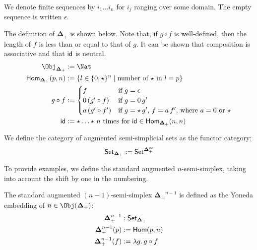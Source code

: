 \documentclass{msc}
\newcommand{\DeltaPlus}{\ensuremath{\boldsymbol{\Delta}_+}}
\newcommand{\kstar}{{\star}}
\begin{document}
\begin{notation}
  We denote finite sequences by $i_1 \ldots i_n$ for $i_j$ ranging over some domain. The empty sequence is written $\epsilon$.
\end{notation}

\begin{definition}[$\DeltaPlus$]
  The definition of $\DeltaPlus$ is shown below. Note that, if $g \circ f$ is well-defined, then the length of $f$ is less than or equal to that of $g$. It can be shown that composition is associative and that $\mathsf{id}$ is neutral.
  \begin{align*}
    \Obj_{\DeltaPlus}       & := \Nat                                                                         \\
    \Hom_{\DeltaPlus}(p, n) & := \{l \in \{0, \kstar\}^n \mid \text{number of $\kstar$ in $l = p$}\}          \\
    g \circ f               & :=
    \begin{cases}
      f                & \text{if $g = \epsilon$}                                           \\
      0\,(g' \circ f)  & \text{if $g = 0\,g'$}                                              \\
      a\,(g' \circ f') & \text{if $g = \kstar\,g'$, $f = a\,f'$, where $a = 0$ or $\kstar$} \\
    \end{cases}                     \\
    \id                     & := \kstar \ldots \kstar \text{ $n$ times for $\id \in \Hom_{\DeltaPlus}(n, n)$}
  \end{align*}
\end{definition}

\begin{definition}[$\Set_{\DeltaPlus}$]
  We define the category of augmented semi-simplicial sets as the functor category:
  \begin{equation*}
    \Set_{\DeltaPlus} := \Set^{\DeltaPlus^{\mathsf{op}}}
  \end{equation*}
\end{definition}

To provide examples, we define the standard augmented $n$-semi-simplex, taking into account the shift by one in the numbering.

\begin{definition}[$\DeltaPlus^n$]
  The standard augmented $(n-1)$-semi-simplex $\DeltaPlus^{n-1}$ is defined as the Yoneda embedding of $n \in \Obj(\DeltaPlus)$:
  \begin{align*}
    \DeltaPlus^{n-1}    & : \Set_{\DeltaPlus}        \\
    \DeltaPlus^{n-1}(p) & := \Hom(p, n)              \\
    \DeltaPlus^{n-1}(f) & := \lambda g .\, g \circ f
  \end{align*}
\end{definition}
\end{document}
